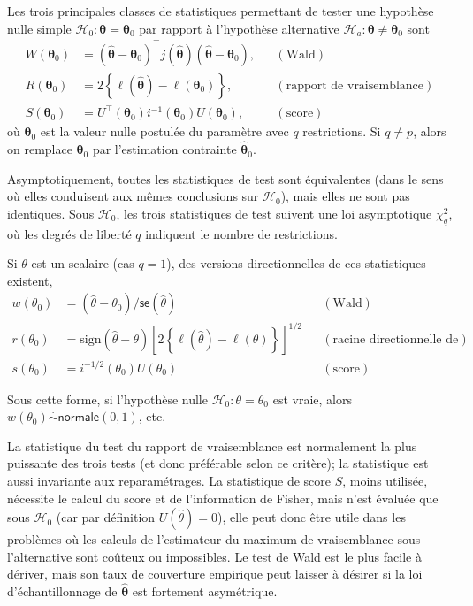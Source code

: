 \documentclass[
  11pt,
  letterpaper,
]{scrbook}
\theoremstyle{plain}
\theoremstyle{definition}
\theoremstyle{plain}
\theoremstyle{definition}
\theoremstyle{remark}
\begin{document}
Les trois principales classes de statistiques permettant de tester une
hypothèse nulle simple
\(\mathscr{H}_0 : \boldsymbol{\theta}=\boldsymbol{\theta}_0\) par
rapport à l'hypothèse alternative
\(\mathscr{H}_a : \boldsymbol{\theta} \neq \boldsymbol{\theta}_0\) sont
\begin{align*}
 W(\boldsymbol{\theta}_0) &= (\widehat{\boldsymbol{\theta}}-\boldsymbol{\theta}_0)^\top j(\widehat{\boldsymbol{\theta}})(\widehat{\boldsymbol{\theta}}-\boldsymbol{\theta}_0), &&(\text{Wald}) \\
 R(\boldsymbol{\theta}_0) &= 2 \left\{ \ell(\widehat{\boldsymbol{\theta}})-\ell(\boldsymbol{\theta}_0)\right\}, &&(\text{rapport de vraisemblance})\\
 S(\boldsymbol{\theta}_0) &= U^\top(\boldsymbol{\theta}_0)i^{-1}(\boldsymbol{\theta}_0)U(\boldsymbol{\theta}_0), && (\text{score})
\end{align*} où \(\boldsymbol{\theta}_0\) est la valeur nulle postulée
du paramètre avec \(q\) restrictions. Si \(q \neq p\), alors on remplace
\(\boldsymbol{\theta}_0\) par l'estimation contrainte
\(\widehat{\boldsymbol{\theta}}_0\).

Asymptotiquement, toutes les statistiques de test sont équivalentes
(dans le sens où elles conduisent aux mêmes conclusions sur
\(\mathscr{H}_0\)), mais elles ne sont pas identiques. Sous
\(\mathscr{H}_0\), les trois statistiques de test suivent une loi
asymptotique \(\chi^2_q\), où les degrés de liberté \(q\) indiquent le
nombre de restrictions.

Si \(\theta\) est un scalaire (cas \(q=1\)), des versions
directionnelles de ces statistiques existent, \begin{align*}
w(\theta_0)&=(\widehat{\theta}-\theta_0)/\mathsf{se}(\widehat{\theta}) &&(\text{Wald}) \\
r({\theta_0}) &= \mathrm{sign}(\widehat{\theta}-\theta)\left[2
\left\{\ell(\widehat{\theta})-\ell(\theta)\right\}\right]^{1/2} &&(\text{racine directionnelle de vraisemblance}) \\
s(\theta_0)&=i^{-1/2}(\theta_0)U(\theta_0) &&(\text{score}) 
\end{align*}

Sous cette forme, si l'hypothèse nulle
\(\mathscr{H}_0: \theta = \theta_0\) est vraie, alors
\(w(\theta_0)\stackrel{\cdot}{\sim} \mathsf{normale}(0,1)\), etc.

La statistique du test du rapport de vraisemblance est normalement la
plus puissante des trois tests (et donc préférable selon ce critère); la
statistique est aussi invariante aux reparamétrages. La statistique de
score \(S\), moins utilisée, nécessite le calcul du score et de
l'information de Fisher, mais n'est évaluée que sous \(\mathscr{H}_0\)
(car par définition \(U(\widehat{\theta})=0\)), elle peut donc être
utile dans les problèmes où les calculs de l'estimateur du maximum de
vraisemblance sous l'alternative sont coûteux ou impossibles. Le test de
Wald est le plus facile à dériver, mais son taux de couverture empirique
peut laisser à désirer si la loi d'échantillonnage de
\(\widehat{\boldsymbol{\theta}}\) est fortement asymétrique.
\end{document}
